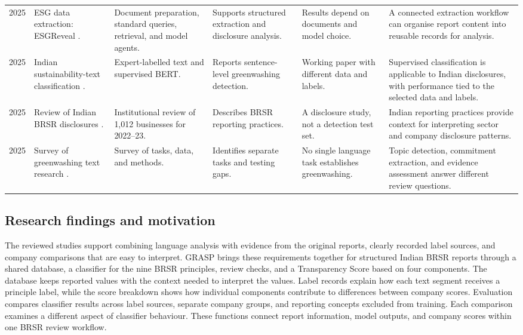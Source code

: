 {\begin{longtable}{@{}L{0.8cm}L{2.35cm}L{2.65cm}L{2.65cm}L{2.65cm}L{3.9cm}@{}}
2025 & ESG data extraction: ESGReveal \cite{zou2025}. & Document preparation, standard queries, retrieval, and model agents. & Supports structured extraction and disclosure analysis. & Results depend on documents and model choice. & A connected extraction workflow can organise report content into reusable records for analysis.\\
2025 & Indian sustainability-text classification \cite{shankar2025}. & Expert-labelled text and supervised BERT. & Reports sentence-level greenwashing detection. & Working paper with different data and labels. & Supervised classification is applicable to Indian disclosures, with performance tied to the selected data and labels.\\
2025 & Review of Indian BRSR disclosures \cite{garg2025}. & Institutional review of 1,012 businesses for 2022--23. & Describes BRSR reporting practices. & A disclosure study, not a detection test set. & Indian reporting practices provide context for interpreting sector and company disclosure patterns.\\
2025 & Survey of greenwashing text research \cite{calamai2025}. & Survey of tasks, data, and methods. & Identifies separate tasks and testing gaps. & No single language task establishes greenwashing. & Topic detection, commitment extraction, and evidence assessment answer different review questions.\\
\end{longtable}}

\subsection{Research findings and motivation}

The reviewed studies support combining language analysis with evidence from the original reports, clearly recorded label sources, and company comparisons that are easy to interpret. GRASP brings these requirements together for structured Indian BRSR reports through a shared database, a classifier for the nine BRSR principles, review checks, and a Transparency Score based on four components. The database keeps reported values with the context needed to interpret the values. Label records explain how each text segment receives a principle label, while the score breakdown shows how individual components contribute to differences between company scores. Evaluation compares classifier results across label sources, separate company groups, and reporting concepts excluded from training. Each comparison examines a different aspect of classifier behaviour. These functions connect report information, model outputs, and company scores within one BRSR review workflow.

